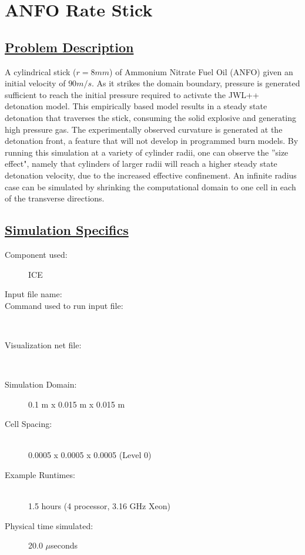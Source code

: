 \section*{\center ANFO Rate Stick}
\subsection*{\underline{Problem Description}}
A cylindrical stick ($r = 8 mm$) of Ammonium Nitrate Fuel Oil (ANFO) given an initial
velocity of $90 m/s$.  As it strikes the domain boundary, pressure is generated
sufficient to reach the initial pressure required to activate the 
JWL++~\cite{ref:JWL} detonation model.  This empirically based model results
in a steady state detonation that traverses the stick, consuming the solid 
explosive and generating high pressure gas.  The experimentally observed
curvature is generated at the detonation front, a feature that will not develop
in programmed burn models.  By running this simulation at
a variety of cylinder radii, one can observe the ''size effect", namely that
cylinders of larger radii will reach a higher steady state detonation velocity,
due to the increased effective confinement.  An infinite radius case can be
simulated by shrinking the computational domain to one cell in each of the
transverse directions.

%
\subsection*{\underline{Simulation Specifics}}
\begin{description}
\item [Component used:] \hfill ICE
\item [Input file name:] \hfill {}
\item [Command used to run input file:]\hfill \\
\item [Visualization net file:]\hfill {}\\

\item [Simulation Domain:]\hfill    0.1 m x 0.015 m x 0.015 m
\item [Cell Spacing:]\hfill \\
0.0005  x 0.0005  x 0.0005 (Level 0)\\

\item [Example Runtimes:] \hfill \\
 1.5 hours   (4 processor, 3.16 GHz Xeon)

\item [Physical time simulated:] \hfill 20.0 $\mu$seconds

\end{description}

